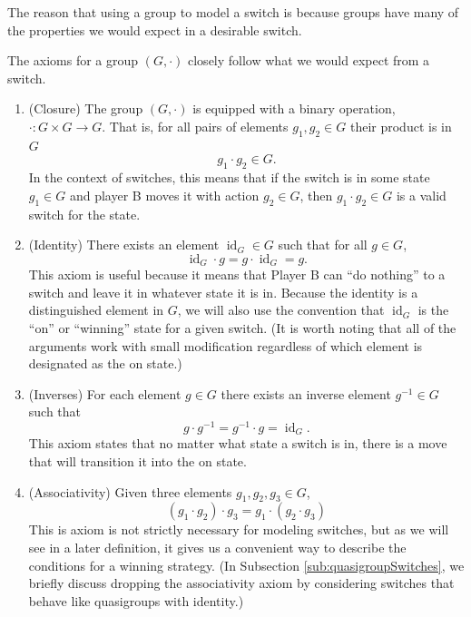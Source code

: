 The reason that using a group to model a switch is because groups have many
of the properties we would expect in a desirable switch.
\begin{note}
  The axioms for a group $(G, \cdot)$ closely follow what we would expect from
  a switch.
\end{note}
 \begin{enumerate}
  \item (Closure) The group $(G, \cdot)$ is equipped with a binary operation,
  $\cdot \colon G \times G \rightarrow G$. That is, for all pairs of elements
   $g_1, g_2 \in G$ their product is in $G$ \begin{equation}
     g_1 \cdot g_2 \in G.
  \end{equation}
  In the context of switches, this
  means that if the switch is in some state $g_1 \in G$ and player B moves
  it with action $g_2 \in G$, then $g_1 \cdot g_2 \in G$ is a valid switch for
  the state.
  \item (Identity) There exists an element $\operatorname{id}_G \in G$ such that
  for all $g \in G$, \begin{equation}
    \operatorname{id}_G \cdot g = g \cdot \operatorname{id}_G = g.
  \end{equation}
  This axiom is useful because it means that Player B can ``do nothing''
  to a switch and leave it in whatever state it is in.
  Because the identity is a distinguished element in $G$,
  we will also use the convention that
  $\operatorname{id}_G$ is the ``on'' or ``winning'' state for a given switch.
  (It is worth noting that all of the arguments work with small modification
  regardless of which element is designated as the on state.)
  \item (Inverses) For each element $g \in G$ there exists an inverse element
  $g^{-1} \in G$ such that \begin{equation}
    g \cdot g^{-1} = g^{-1} \cdot g = \operatorname{id}_G.
  \end{equation}
  This axiom states that no matter what state a switch is in,
  there is a move that will transition it into the on state.
  \item (Associativity) Given three elements $g_1, g_2, g_3 \in G$,
  \begin{equation}
    (g_1 \cdot g_2) \cdot g_3 = g_1 \cdot (g_2 \cdot g_3)
  \end{equation}
  This is axiom is not strictly necessary for modeling switches,
  but as we will see in a later definition, it gives us a convenient way to
  describe the conditions for a winning strategy.
  (In Subsection \ref{sub:quasigroupSwitches}, we briefly discuss dropping
  the associativity axiom by considering switches that behave like
  quasigroups with identity.)
\end{enumerate}

